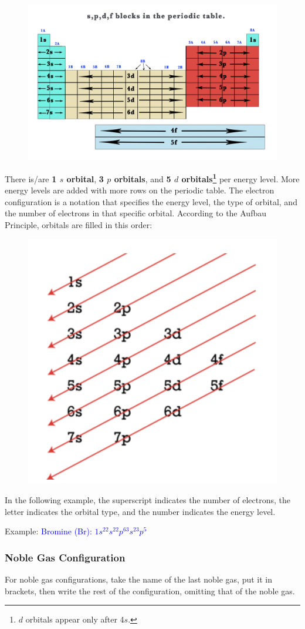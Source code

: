 \documentclass[a4paper, 12pt]{article}
\begin{document}
\begin{figure}[H]
    \centering
    \includegraphics[width=0.7\linewidth]{spdfblocks.png}
    \label{fig:2}
\end{figure}
\noindent There is/are \textbf{1 $s$ orbital}, \textbf{3 $p$ orbitals}, and \textbf{5 $d$ orbitals\footnote{$d$ orbitals appear only after 4$s$.}} per energy level. More energy levels are added with more rows on the periodic table. The electron configuration is a notation that specifies the energy level, the type of orbital, and the number of electrons in that specific orbital. According to the Aufbau Principle, orbitals are filled in this order: 

\begin{figure}[H]
    \centering
    \includegraphics[width=0.4\linewidth]{aufbauprinciple.png}
    \label{fig:3}
\end{figure}

\noindent In the following example, the superscript indicates the number of electrons, the letter indicates the orbital type, and the number indicates the energy level.
 
Example: \textcolor{blue}{Bromine (Br): $1s^22s^22p^63s^23p^5$}

\subsubsection*{Noble Gas Configuration}
For noble gas configurations, take the name of the last noble gas, put it in brackets, then write the rest of the configuration, omitting that of the noble gas.
 
\end{document}
